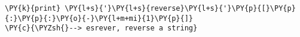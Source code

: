 \begin{Verbatim}[commandchars=\\\{\}]
\PY{k}{print} \PY{l+s}{'}\PY{l+s}{reverse}\PY{l+s}{'}\PY{p}{[}\PY{p}{:}\PY{p}{:}\PY{o}{-}\PY{l+m+mi}{1}\PY{p}{]}
\PY{c}{\PYZsh{}--> esrever, reverse a string}
\end{Verbatim}
